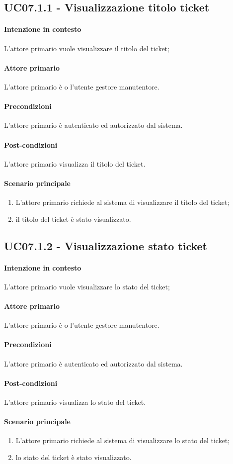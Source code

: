 \subsection{UC07.1.1 - Visualizzazione titolo ticket}\label{uc:07.1.1}

\paragraph{Intenzione in contesto} L'attore primario vuole visualizzare il titolo del ticket;
\paragraph{Attore primario} L'attore primario è o l'utente gestore manutentore.
\paragraph{Precondizioni} L'attore primario è autenticato ed autorizzato dal sistema.
\paragraph{Post-condizioni} L'attore primario visualizza il titolo del ticket.
\paragraph{Scenario principale}
\begin{enumerate}
    \item L'attore primario richiede al sistema di visualizzare il titolo del ticket;
    \item il titolo del ticket è stato visualizzato.
\end{enumerate}

\subsection{UC07.1.2 - Visualizzazione stato ticket}\label{uc:07.1.2}

\paragraph{Intenzione in contesto} L'attore primario vuole visualizzare lo stato del ticket;
\paragraph{Attore primario} L'attore primario è o l'utente gestore manutentore.
\paragraph{Precondizioni} L'attore primario è autenticato ed autorizzato dal sistema.
\paragraph{Post-condizioni} L'attore primario visualizza lo stato del ticket.
\paragraph{Scenario principale}
\begin{enumerate}
    \item L'attore primario richiede al sistema di visualizzare lo stato del ticket;
    \item lo stato del ticket è stato visualizzato.
\end{enumerate}